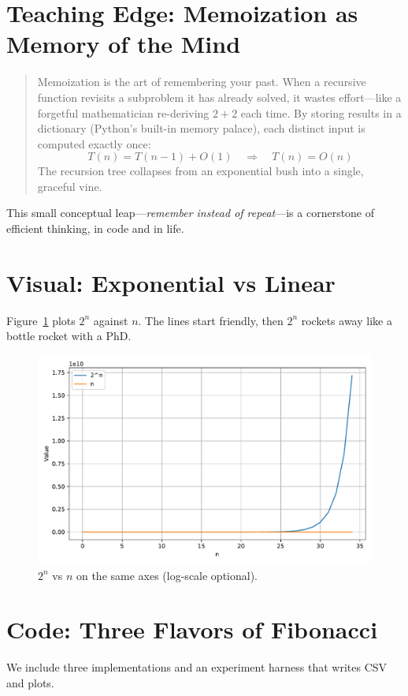 \section{Teaching Edge: Memoization as Memory of the Mind}

\begin{quote}
Memoization is the art of remembering your past. When a recursive
function revisits a subproblem it has already solved, it wastes
effort—like a forgetful mathematician re-deriving $2+2$ each time.
By storing results in a dictionary (Python’s built-in memory palace),
each distinct input is computed exactly once:
\[
T(n) = T(n-1) + O(1) \quad \Rightarrow \quad T(n) = O(n)
\]
The recursion tree collapses from an exponential bush into a single,
graceful vine.
\end{quote}

This small conceptual leap—\textit{remember instead of repeat}—is a
cornerstone of efficient thinking, in code and in life.





\section{Visual: Exponential vs Linear}
Figure~\ref{fig:bigocurves} plots $2^n$ against $n$. The lines start friendly, then $2^n$ rockets away like a bottle rocket with a PhD.
\begin{figure}[htbp]
  \centering
  \includegraphics[width=.85\textwidth]{chapters/big_o_curves.pdf}
  \caption{$2^n$ vs $n$ on the same axes (log-scale optional).}
  \label{fig:bigocurves}
\end{figure}

\section{Code: Three Flavors of Fibonacci}
We include three implementations and an experiment harness that writes CSV and plots.

